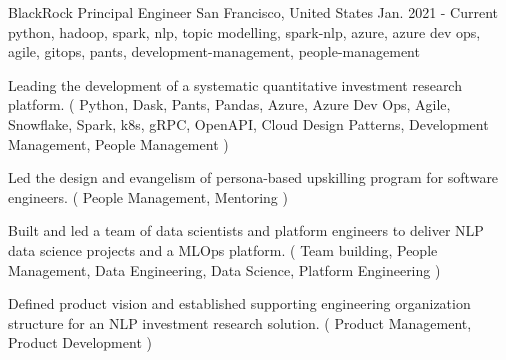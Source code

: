 \cventry
    {BlackRock} %
    {Principal Engineer} %
    {San Francisco, United States} %
    {Jan. 2021 - Current} %
    { python, hadoop, spark, nlp, topic modelling, spark-nlp, azure, azure dev ops, agile, gitops, pants, development-management, people-management} %
    {
    \begin{cvitems} %
       \item { Leading the development of a systematic quantitative investment research platform. ( Python, Dask, Pants, Pandas, Azure, Azure Dev Ops, Agile, Snowflake, Spark, k8s, gRPC, OpenAPI, Cloud Design Patterns, Development Management, People Management ) }
       \item { Led the design and evangelism of persona-based upskilling program for software engineers. ( People Management, Mentoring ) }
       \item { Built and led a team of data scientists and platform engineers to deliver NLP data science projects and a MLOps platform. ( Team building, People Management, Data Engineering, Data Science, Platform Engineering ) }
       \item { Defined product vision and established supporting engineering organization structure for an NLP investment research solution. ( Product Management, Product Development ) }
    \end{cvitems}
    }
